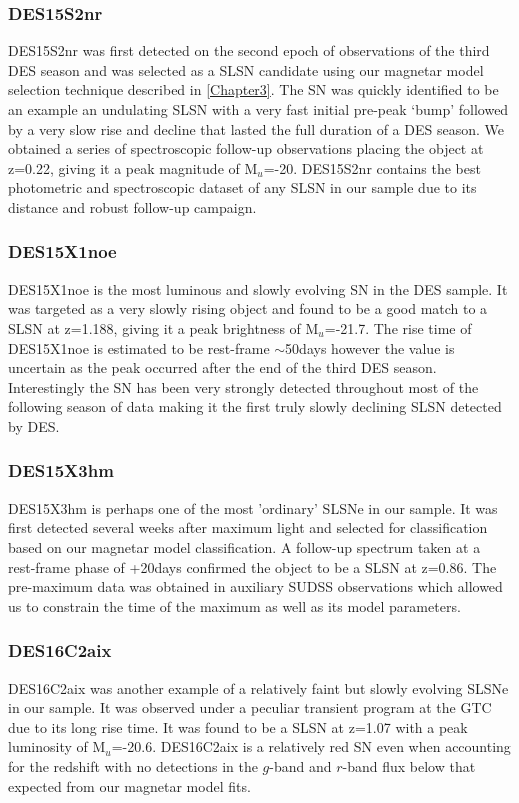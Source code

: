\subsubsection{DES15S2nr}
DES15S2nr was first detected on the second epoch of observations of the third DES season and was selected as a SLSN candidate using our magnetar model selection technique described in \cref{Chapter3}. The SN was quickly identified to be an example an undulating SLSN with a very fast initial pre-peak `bump' followed by a very slow rise and decline that lasted the full duration of a DES season. We obtained a series of spectroscopic follow-up observations placing the object at z=0.22, giving it a peak magnitude of M$_u$=-20. DES15S2nr contains the best photometric and spectroscopic dataset of any SLSN in our sample due to its distance and robust follow-up campaign.

\subsubsection{DES15X1noe}
DES15X1noe is the most luminous and slowly evolving SN in the DES sample. It was targeted as a very slowly rising object and found to be a good match to a SLSN at z=1.188, giving it a peak brightness of M$_u$=-21.7. The rise time of DES15X1noe is estimated to be rest-frame $\sim$50days however the value is uncertain as the peak occurred after the end of the third DES season. Interestingly the SN has been very strongly detected throughout most of the following season of data making it the first truly slowly declining SLSN detected by DES.

\subsubsection{DES15X3hm}
DES15X3hm is perhaps one of the most 'ordinary' SLSNe in our sample. It was first detected several weeks after maximum light and selected for classification based on our magnetar model classification. A follow-up spectrum taken at a rest-frame phase of +20days confirmed the object to be a SLSN at z=0.86. The pre-maximum data was obtained in auxiliary SUDSS observations which allowed us to constrain the time of the maximum as well as its model parameters.

\subsubsection{DES16C2aix}
DES16C2aix was another example of a relatively faint but slowly evolving SLSNe in our sample. It was observed under a peculiar transient program at the GTC due to its long rise time. It was found to be a SLSN at z=1.07 with a peak luminosity of M$_u$=-20.6. DES16C2aix is a relatively red SN even when accounting for the redshift with no detections in the $g$-band and $r$-band flux below that expected from our magnetar model fits.

